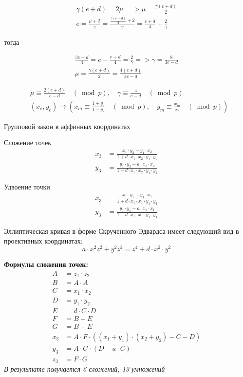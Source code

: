 $$
\begin{gathered}
\gamma(e+d)=2 \mu=>\mu=\frac{\gamma(e+d)}{2} \\
e=\frac{\mu+2}{\gamma}=\frac{\frac{\gamma(e+d)}{2}+2}{\gamma}=\frac{e+d}{4}+\frac{2}{\gamma}
\end{gathered}
$$

тогда

$$
\begin{gathered}
\frac{3 e-d}{4}=e-\frac{e+d}{4}=\frac{2}{\gamma}=>\gamma=\frac{8}{3 e-d} \\
\mu=\frac{\gamma(e+d)}{2}=\frac{4(e+d)}{3 e-d}
\end{gathered}
$$

$$
\begin{aligned}
& \mu \equiv \frac{2(e+d)}{e-d} \quad(\bmod p), \quad \gamma \equiv \frac{4}{e-d} \quad(\bmod p) \\
&\left(x_{e}, y_{e}\right) \rightarrow\left(x_{m} \equiv \frac{1+y_{e}}{1-y_{e}} \quad(\bmod p), \quad y_{m} \equiv \frac{x_{m}}{x_{e}} \quad(\bmod p)\right)
\end{aligned}
$$

Групповой закон в аффинных координатах

Сложение точек
\begin{align*}
x_3 &= \frac{x_1 \cdot y_2 + y_1 \cdot x_2}{1 + d \cdot x_1 \cdot x_2 \cdot y_1 \cdot y_2} \\
y_3 &= \frac{y_1 \cdot y_2 - a \cdot x_1 \cdot x_2}{1 - d \cdot x_1 \cdot x_2 \cdot y_1 \cdot y_2}
\end{align*}

Удвоение точки
\begin{align*}
x_3 &= \frac{x_1 \cdot y_1 + y_1 \cdot x_1}{1 + d \cdot x_1 \cdot x_1 \cdot y_1 \cdot y_1} \\
y_3 &= \frac{y_1 \cdot y_1 - a \cdot x_1 \cdot x_1}{1 - d \cdot x_1 \cdot x_1 \cdot y_1 \cdot y_1}
\end{align*}

Эллиптическая кривая в форме Скрученного Эдвардса имеет следующий вид в проективных координатах:
\begin{equation*}
a \cdot x^2z^2 + y^2z^2 = z^4 + d \cdot x^2 \cdot y^2
\end{equation*}

\textbf{Формулы сложения точек:~\cite{edwards-formulas}}
\begin{align*}
A &= z_1 \cdot z_2 \\
B &= A \cdot A \\
C &= x_1 \cdot x_2 \\
D &= y_1 \cdot y_2 \\
E &= d \cdot C \cdot D \\
F &= B - E \\
G &= B + E \\
x_3 &= A \cdot F \cdot ((x_1 + y_1) \cdot (x_2 + y_2) - C - D) \\
y_3 &= A \cdot G \cdot (D - a \cdot C) \\
z_3 &= F \cdot G
\end{align*}
\textit{В результате получается 6 сложений, 13 умножений}

